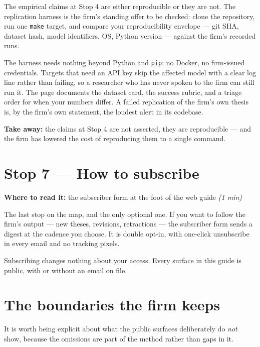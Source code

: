 \documentclass[11pt,letterpaper]{article}
\newcommand{\surface}[1]{\texttt{#1}}
\newcommand{\rt}[1]{\textsl{#1}}
\begin{document}
The empirical claims at Stop 4 are either reproducible or they are not. The replication harness is the firm's standing offer to be checked: clone the repository, run one \surface{make} target, and compare your reproducibility envelope --- git SHA, dataset hash, model identifiers, OS, Python version --- against the firm's recorded runs.

The harness needs nothing beyond Python and \surface{pip}: no Docker, no firm-issued credentials. Targets that need an API key skip the affected model with a clear log line rather than failing, so a researcher who has never spoken to the firm can still run it. The page documents the dataset card, the success rubric, and a triage order for when your numbers differ. A failed replication of the firm's own thesis is, by the firm's own statement, the loudest alert in its codebase.

\textbf{Take away:} the claims at Stop 4 are not asserted, they are reproducible --- and the firm has lowered the cost of reproducing them to a single command.

\section{Stop 7 --- How to subscribe}

\textbf{Where to read it:} the subscriber form at the foot of the web guide \quad \rt{(1 min)}

\medskip

The last stop on the map, and the only optional one. If you want to follow the firm's output --- new theses, revisions, retractions --- the subscriber form sends a digest at the cadence you choose. It is double opt-in, with one-click unsubscribe in every email and no tracking pixels.

Subscribing changes nothing about your access. Every surface in this guide is public, with or without an email on file.

\section{The boundaries the firm keeps}

It is worth being explicit about what the public surfaces deliberately do \emph{not} show, because the omissions are part of the method rather than gaps in it.
\end{document}

